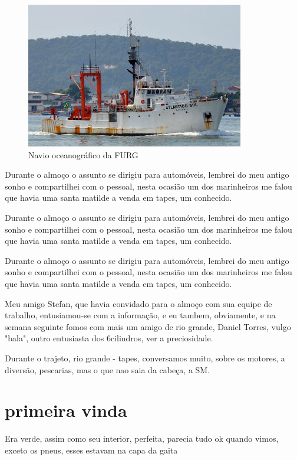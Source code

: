 \documentclass[a4paper]{report}
\begin{document}
\begin{figure}[!htb]
\centering
\includegraphics{atsul}
\caption{Navio oceanogr\'afico da FURG}
\label{at_sul}
\end{figure}

Durante o almo\c{c}o o assunto se dirigiu para autom\'oveis, lembrei do meu antigo sonho e compartilhei com o pessoal, nesta ocasi\~ao um dos marinheiros
me falou que havia uma santa matilde a venda em tapes, um conhecido.


Durante o almo\c{c}o o assunto se dirigiu para autom\'oveis, lembrei do meu antigo sonho e compartilhei com o pessoal, nesta ocasi\~ao um dos marinheiros
me falou que havia uma santa matilde a venda em tapes, um conhecido.

Durante o almo\c{c}o o assunto se dirigiu para autom\'oveis, lembrei do meu antigo sonho e compartilhei com o pessoal, nesta ocasi\~ao um dos marinheiros
me falou que havia uma santa matilde a venda em tapes, um conhecido.

Meu amigo Stefan, que havia convidado para o almo\c{c}o com sua equipe de trabalho, entusiamou-se com a informa\c{c}\~ao, e eu tambem, obviamente, e na semana 
seguinte fomos com mais um amigo de rio grande, Daniel Torres, vulgo "bala", outro entusiasta dos 6cilindros, ver a preciosidade.

Durante o trajeto, rio grande - tapes, conversamos muito, sobre os motores, a divers\~ao, pescarias, mas o que nao saia da cabe\c{c}a, a SM.   
\clearpage


\section*{primeira vinda}

Era verde, assim como seu interior, perfeita, parecia tudo ok quando vimos, exceto os pneus, esses estavam na capa da gaita
\end{document}
